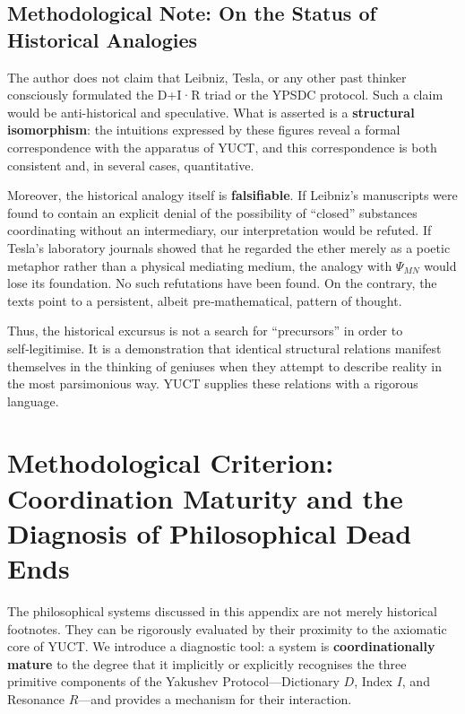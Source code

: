 \documentclass[12pt,a4paper]{article}
\begin{document}
	\subsection{Methodological Note: On the Status of Historical Analogies}
	\label{subsec:methodological-note}
	
	The author does not claim that Leibniz, Tesla, or any other past thinker consciously formulated the D+I·R triad or the YPSDC protocol. Such a claim would be anti-historical and speculative. What is asserted is a \textbf{structural isomorphism}: the intuitions expressed by these figures reveal a formal correspondence with the apparatus of YUCT, and this correspondence is both consistent and, in several cases, quantitative.
	
	Moreover, the historical analogy itself is \textbf{falsifiable}. If Leibniz’s manuscripts were found to contain an explicit denial of the possibility of ``closed'' substances coordinating without an intermediary, our interpretation would be refuted. If Tesla’s laboratory journals showed that he regarded the ether merely as a poetic metaphor rather than a physical mediating medium, the analogy with \(\Psi_{MN}\) would lose its foundation. No such refutations have been found. On the contrary, the texts point to a persistent, albeit pre‑mathematical, pattern of thought.
	
	Thus, the historical excursus is not a search for ``precursors'' in order to self‑legitimise. It is a demonstration that identical structural relations manifest themselves in the thinking of geniuses when they attempt to describe reality in the most parsimonious way. YUCT supplies these relations with a rigorous language.
	
	\section{Methodological Criterion: Coordination Maturity and the Diagnosis of Philosophical Dead Ends}
	\label{sec:methodological-criterion}
	
	The philosophical systems discussed in this appendix are not merely historical footnotes. They can be rigorously evaluated by their proximity to the axiomatic core of YUCT. We introduce a diagnostic tool: a system is \textbf{coordinationally mature} to the degree that it implicitly or explicitly recognises the three primitive components of the Yakushev Protocol---Dictionary \(D\), Index \(I\), and Resonance \(R\)---and provides a mechanism for their interaction.
	
\end{document}
